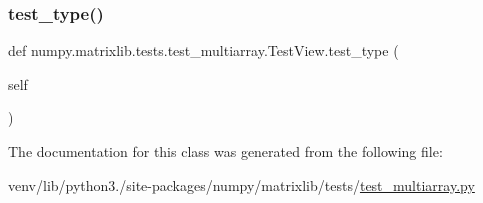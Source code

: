 \mbox{\label{classnumpy_1_1matrixlib_1_1tests_1_1test__multiarray_1_1TestView_adcab401a4622acb77e8b186115e7ebc3}} 
\subsubsection{\texorpdfstring{test\+\_\+type()}{test\_type()}}
{\footnotesize\ttfamily def numpy.\+matrixlib.\+tests.\+test\+\_\+multiarray.\+Test\+View.\+test\+\_\+type (\begin{DoxyParamCaption}\item[{}]{self }\end{DoxyParamCaption})}



The documentation for this class was generated from the following file\+:\begin{DoxyCompactItemize}
\item 
venv/lib/python3./site-\/packages/numpy/matrixlib/tests/\hyperlink{matrixlib_2tests_2test__multiarray_8py}{test\+\_\+multiarray.\+py}\end{DoxyCompactItemize}
